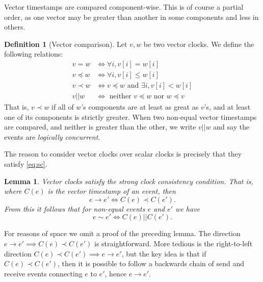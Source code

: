 \documentclass[]             %
{NASA}                       %
\newtheorem{lemma}[theorem]{Lemma}
\theoremstyle{definition}
\newtheorem{definition}{Definition}[section]
\begin{document}

Vector timestamps are compared component-wise. This is of course a
partial order, as one vector may be greater than another in some
components and less in others.
\begin{definition}[Vector comparison]
  Let $v, w$ be two vector clocks. We define the following relations:
  \begin{align*}
             v = w &\iff \forall i, v[i] = w[i] \\
  v \preccurlyeq w &\iff \forall i, v[i] \leq w[i] \\
         v \prec w &\iff v \preccurlyeq w \textrm{ and } \exists i, v[i] < w[i] \\
            v || w &\iff \textrm{ neither } v \preccurlyeq w \textrm{ nor } w \preccurlyeq v
  \end{align*}
  That is, $v \prec w$ if all of $w$'s components are at least as
  great as $v$'s, and at least one of its components is strictly
  greater. When two non-equal vector timestamps are compared, and
  neither is greater than the other, we write $v || w$ and say the
  events are \emph{logically concurrent}.
\end{definition}

The reason to consider vector clocks over scalar clocks is precisely
that they satisfy \ref{eq:sc}.
\begin{lemma}
  Vector clocks satisfy the strong clock consistency condition. That
  is, where $C(e)$ is the vector timestamp of an event, then
  \[ e \to e' \iff C(e) \prec C(e'). \]
  From this it follows that for non-equal events $e$ and $e'$ we have
  \[ e \sim e' \iff C(e) || C(e'). \]
\end{lemma}

For reasons of space we omit a proof of the preceding lemma.  The
direction $e \to e' \implies C(e) \prec C(e')$ is
straightforward. More tedious is the right-to-left direction
$C(e) \prec C(e') \implies e \to e'$, but the key idea is that if
$C(e) \prec C(e')$, then it is possible to follow a backwards chain of
send and receive events connecting $e$ to $e'$, hence $e \to e'$.

\end{document}
